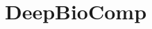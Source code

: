 \documentclass[acmsmall]{acmart}					%
\begin{document}
	
	
	\title{DeepBioComp}
	
	
	
	
	
	\maketitle
	
	
	
	
	
	
	
	
	
	
	
	
\end{document}
